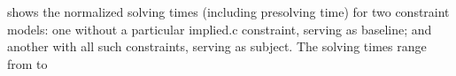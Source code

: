 \renewcommand{\thefigure}{\oldthefigure}

 shows the normalized
solving times (including presolving time) for two \glspl{constraint model}: one
without a particular \gls{implied.c} \gls{constraint}, serving as
\gls{baseline}; and another with all such \glspl{constraint}, serving as
\gls{subject}.
%
The solving times range from
\SIMinOf{
  \SolvTechDisableImplConsDefsDominateDefsPrePlusSolvingTimeSpeedupAllPrePlusSolvingTimeAvgMin,
  \SolvTechDisableImplConsDefsDominateDefsPrePlusSolvingTimeSpeedupPrePlusSolvingTimeAvgMin,
  \SolvTechDisableImplConsDefsInSpannedBlocksPrePlusSolvingTimeSpeedupPrePlusSolvingTimeAvgMin,
  \SolvTechDisableImplConsIdenticalEntryBlocksPrePlusSolvingTimeSpeedupPrePlusSolvingTimeAvgMin,
  \SolvTechDisableImplConsDefsDominateEntryBlocksPrePlusSolvingTimeSpeedupPrePlusSolvingTimeAvgMin,
  \SolvTechDisableImplConsPlacePhiOpsSameAsDefEdgesPrePlusSolvingTimeSpeedupPrePlusSolvingTimeAvgMin,
  \SolvTechDisableImplConsNoSpanUsesPrePlusSolvingTimeSpeedupPrePlusSolvingTimeAvgMin,
  \SolvTechDisableImplConsNoSpanDefsPrePlusSolvingTimeSpeedupPrePlusSolvingTimeAvgMin,
  \SolvTechDisableImplConsNoSpanUseDefsPrePlusSolvingTimeSpeedupPrePlusSolvingTimeAvgMin,
  \SolvTechDisableImplConsSpannedInputPrePlusSolvingTimeSpeedupPrePlusSolvingTimeAvgMin,
  \SolvTechDisableImplConsUsedDataMustBeAvailablePrePlusSolvingTimeSpeedupPrePlusSolvingTimeAvgMin,
  \SolvTechDisableImplConsExteriorDataMustBeAvailablePrePlusSolvingTimeSpeedupPrePlusSolvingTimeAvgMin,
  \SolvTechDisableImplConsLocsOfUsesPrePlusSolvingTimeSpeedupPrePlusSolvingTimeAvgMin,
  \SolvTechDisableImplConsLocsOfDefsPrePlusSolvingTimeSpeedupPrePlusSolvingTimeAvgMin,
  \SolvTechDisableImplConsFixFallThroughsPrePlusSolvingTimeSpeedupPrePlusSolvingTimeAvgMin
}{\s} to
\SIMaxOf[round-precision=0]{
  \SolvTechDisableImplConsDefsDominateDefsPrePlusSolvingTimeSpeedupAllPrePlusSolvingTimeAvgMax,
  \SolvTechDisableImplConsDefsDominateDefsPrePlusSolvingTimeSpeedupPrePlusSolvingTimeAvgMax,
  \SolvTechDisableImplConsDefsInSpannedBlocksPrePlusSolvingTimeSpeedupPrePlusSolvingTimeAvgMax,
  \SolvTechDisableImplConsIdenticalEntryBlocksPrePlusSolvingTimeSpeedupPrePlusSolvingTimeAvgMax,
  \SolvTechDisableImplConsDefsDominateEntryBlocksPrePlusSolvingTimeSpeedupPrePlusSolvingTimeAvgMax,
  \SolvTechDisableImplConsPlacePhiOpsSameAsDefEdgesPrePlusSolvingTimeSpeedupPrePlusSolvingTimeAvgMax,
  \SolvTechDisableImplConsNoSpanUsesPrePlusSolvingTimeSpeedupPrePlusSolvingTimeAvgMax,
  \SolvTechDisableImplConsNoSpanDefsPrePlusSolvingTimeSpeedupPrePlusSolvingTimeAvgMax,
  \SolvTechDisableImplConsNoSpanUseDefsPrePlusSolvingTimeSpeedupPrePlusSolvingTimeAvgMax,
  \SolvTechDisableImplConsSpannedInputPrePlusSolvingTimeSpeedupPrePlusSolvingTimeAvgMax,
  \SolvTechDisableImplConsUsedDataMustBeAvailablePrePlusSolvingTimeSpeedupPrePlusSolvingTimeAvgMax,
  \SolvTechDisableImplConsExteriorDataMustBeAvailablePrePlusSolvingTimeSpeedupPrePlusSolvingTimeAvgMax,
  \SolvTechDisableImplConsLocsOfUsesPrePlusSolvingTimeSpeedupPrePlusSolvingTimeAvgMax,
  \SolvTechDisableImplConsLocsOfDefsPrePlusSolvingTimeSpeedupPrePlusSolvingTimeAvgMax,
  \SolvTechDisableImplConsFixFallThroughsPrePlusSolvingTimeSpeedupPrePlusSolvingTimeAvgMax
}{\s}
